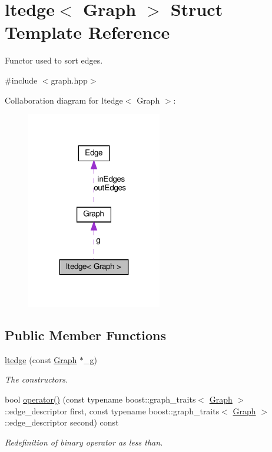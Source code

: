 \hypertarget{structltedge}{}\section{ltedge$<$ Graph $>$ Struct Template Reference}
\label{structltedge}


Functor used to sort edges.  




{\ttfamily \#include $<$graph.\+hpp$>$}



Collaboration diagram for ltedge$<$ Graph $>$\+:
\nopagebreak
\begin{figure}[H]
\begin{center}
\leavevmode
\includegraphics[width=167pt]{d1/d0d/structltedge__coll__graph}
\end{center}
\end{figure}
\subsection*{Public Member Functions}
\begin{DoxyCompactItemize}
\item 
\hyperlink{structltedge_a2bca6fca02105aa2460903cbca279f70}{ltedge} (const \hyperlink{structGraph}{Graph} $\ast$\+\_\+g)
\begin{DoxyCompactList}\small\item\em The constructors. \end{DoxyCompactList}\item 
bool \hyperlink{structltedge_a3bdba37318ae2ef9df726309ba302c65}{operator()} (const typename boost\+::graph\+\_\+traits$<$ \hyperlink{structGraph}{Graph} $>$\+::edge\+\_\+descriptor first, const typename boost\+::graph\+\_\+traits$<$ \hyperlink{structGraph}{Graph} $>$\+::edge\+\_\+descriptor second) const
\begin{DoxyCompactList}\small\item\em Redefinition of binary operator as less than. \end{DoxyCompactList}\end{DoxyCompactItemize}
